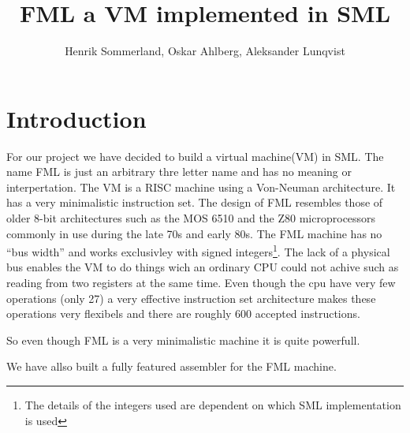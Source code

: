 \documentclass{article}
\title{FML a VM implemented in SML}
\author{Henrik Sommerland, Oskar Ahlberg, Aleksander Lunqvist}
\date
\begin{document}
\maketitle
\section{Introduction}
For our project we have decided to build a virtual machine(VM) in SML. The name
FML is just an arbitrary thre letter name and has no meaning or interpertation.
The VM is a RISC machine using a Von-Neuman architecture. It has a very
minimalistic instruction set. The design of FML resembles those of older 8-bit
architectures such as the MOS 6510 and the Z80 microprocessors commonly in use
during the late 70s and early 80s. The FML machine has no ``bus width'' and
works exclusivley with signed integers\footnote{The details of the integers
used are dependent on which SML implementation is used}. The lack of a physical
bus enables the VM to do things wich an ordinary CPU could not achive such as
reading from two registers at the same time. Even though the cpu have very few
operations (only 27) a very effective instruction set architecture
makes these operations very flexibels and there are roughly 600 accepted 
instructions.

So even though FML is a very minimalistic machine it is quite powerfull.

We have allso built a fully featured assembler for the FML machine.
\end{document}
